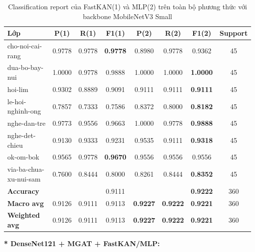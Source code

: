 \begin{table}[H]
\centering
\renewcommand{\arraystretch}{1.08}
\caption{\centering Classification report của FastKAN(1) và MLP(2) trên toàn bộ phương thức với backbone MobileNetV3 Small}
\begin{tabular}{lccccccc}
\hline
\textbf{Lớp} &
\textbf{P(1)} & \textbf{R(1)} & \textbf{F1(1)} &
\textbf{P(2)} & \textbf{R(2)} & \textbf{F1(2)} &
\textbf{Support} \\
\hline

cho-noi-cai-rang
& 0.9778 & 0.9778 & \textbf{0.9778}
& 0.8980 & 0.9778 & 0.9362 & 45 \\

dua-bo-bay-nui
& 1.0000 & 0.9778 & 0.9888
& 1.0000 & 1.0000 & \textbf{1.0000} & 45 \\

hoi-lim
& 0.9302 & 0.8889 & 0.9091
& 0.9111 & 0.9111 & \textbf{0.9111} & 45 \\

le-hoi-nghinh-ong
& 0.7857 & 0.7333 & 0.7586
& 0.8372 & 0.8000 & \textbf{0.8182} & 45 \\

nghe-dan-tre
& 0.9773 & 0.9556 & 0.9663
& 1.0000 & 0.9778 & \textbf{0.9888} & 45 \\

nghe-det-chieu
& 0.9130 & 0.9333 & 0.9231
& 0.9535 & 0.9111 & \textbf{0.9318} & 45 \\

ok-om-bok
& 0.9565 & 0.9778 & \textbf{0.9670}
& 0.9556 & 0.9556 & 0.9556 & 45 \\

via-ba-chua-xu-nui-sam
& 0.7600 & 0.8444 & 0.8000
& 0.8261 & 0.8444 & \textbf{0.8352} & 45 \\
\hline

\textbf{Accuracy}
& & & 0.9111
& & & \textbf{0.9222} & 360 \\

\textbf{Macro avg}
& 0.9126 & 0.9111 & 0.9113
& \textbf{0.9227} & \textbf{0.9222} & \textbf{0.9221} & 360 \\

\textbf{Weighted avg}
& 0.9126 & 0.9111 & 0.9113
& \textbf{0.9227} & \textbf{0.9222} & \textbf{0.9221} & 360 \\
\hline
\end{tabular}
\end{table}
\textbf{* DenseNet121 + MGAT + FastKAN/MLP:}
